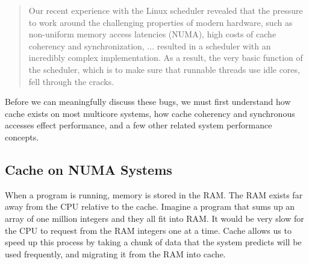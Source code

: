 \documentclass{sig-alternate}
\begin{document}
\begin{quote}
Our recent experience with the Linux scheduler revealed that the pressure to work around the challenging properties of modern hardware, such as non-uniform memory access latencies (NUMA), high costs of cache coherency and synchronization, ... resulted in a scheduler with an incredibly complex implementation. As a result, the very basic function of the scheduler, which is to make sure that runnable threads use idle cores, fell through the cracks.~\cite{Lozi:2016}
\end{quote}

Before we can meaningfully discuss these bugs, we must first understand how cache exists on most multicore systems, how cache coherency and synchronous accesses effect performance, and a few other related system performance concepts.



\subsection{Cache on NUMA Systems}
\label{sec:cache}

When a program is running, memory is stored in the RAM. The RAM exists far away from the CPU relative to the cache. Imagine a program that sums up an array of one million integers and they all fit into RAM. It would be very slow for the CPU to request from the RAM integers one at a time. Cache allows us to speed up this process by taking a chunk of data that the system predicts will be used frequently, and migrating it from the RAM into cache.
\end{document}
